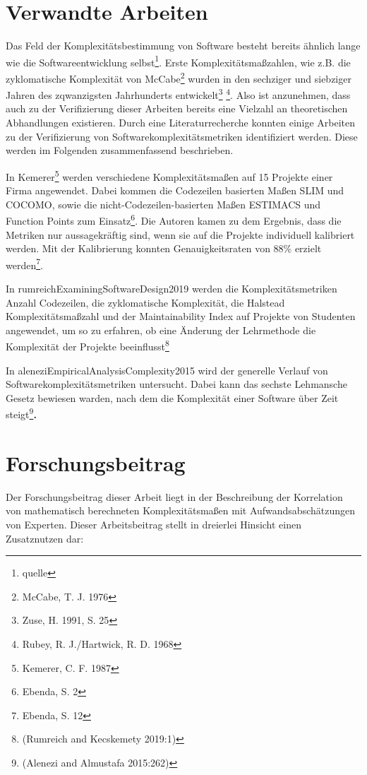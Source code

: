 \section{Verwandte Arbeiten}\label{verwandte-arbeiten}

Das Feld der Komplexitätsbestimmung von Software besteht bereits ähnlich
lange wie die Softwareentwicklung selbst\footnote{quelle}. Erste
Komplexitätsmaßzahlen, wie z.B. die zyklomatische Komplexität von
McCabe\footnote{McCabe, T. J. 1976} wurden in den sechziger und
siebziger Jahren des zqwanzigsten Jahrhunderts entwickelt\footnote{Zuse,
  H. 1991, S. 25} \footnote{Rubey, R. J./Hartwick, R. D. 1968}. Also ist
anzunehmen, dass auch zu der Verifizierung dieser Arbeiten bereits eine
Vielzahl an theoretischen Abhandlungen existieren. Durch eine
Literaturrecherche konnten einige Arbeiten zu der Verifizierung von
Softwarekomplexitätsmetriken identifiziert werden. Diese werden im
Folgenden zusammenfassend beschrieben.

In Kemerer\footnote{Kemerer, C. F. 1987} werden verschiedene
Komplexitätsmaßen auf 15 Projekte einer Firma angewendet. Dabei kommen
die Codezeilen basierten Maßen SLIM und COCOMO, sowie die
nicht-Codezeilen-basierten Maßen ESTIMACS und Function Points zum
Einsatz\footnote{Ebenda, S. 2}. Die Autoren kamen zu dem Ergebnis, dass
die Metriken nur aussagekräftig sind, wenn sie auf die Projekte
individuell kalibriert werden. Mit der Kalibrierung konnten
Genauigkeitsraten von 88\% erzielt werden\footnote{Ebenda, S. 12}.

In rumreichExaminingSoftwareDesign2019 werden die Komplexitätsmetriken
Anzahl Codezeilen, die zyklomatische Komplexität, die Halstead
Komplexitätsmaßzahl und der Maintainability Index auf Projekte von
Studenten angewendet, um so zu erfahren, ob eine Änderung der
Lehrmethode die Komplexität der Projekte beeinflusst\footnote{(Rumreich
  and Kecskemety 2019:1)}

In aleneziEmpiricalAnalysisComplexity2015 wird der generelle Verlauf von
Softwarekomplexitätsmetriken untersucht. Dabei kann das sechste
Lehmansche Gesetz bewiesen warden, nach dem die Komplexität einer
Software über Zeit steigt\footnote{(Alenezi and Almustafa 2015:262)}\textbf{.}

\section{Forschungsbeitrag}\label{forschungsbeitrag}

Der Forschungsbeitrag dieser Arbeit liegt in der Beschreibung der
Korrelation von mathematisch berechneten Komplexitätsmaßen mit
Aufwandsabschätzungen von Experten. Dieser Arbeitsbeitrag stellt in
dreierlei Hinsicht einen Zusatznutzen dar:

